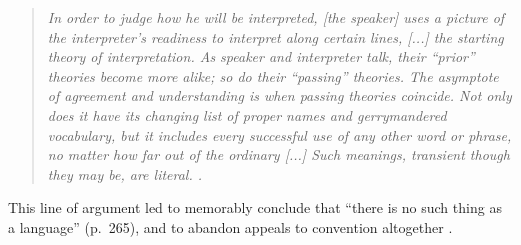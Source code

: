 \begin{quote}
\footnotesize\emph{In order to judge how he will be interpreted, [the speaker] uses a picture of the interpreter’s readiness to interpret along certain lines, [...] the starting theory of interpretation. %
As speaker and interpreter talk, their ``prior'' theories become more alike; so do their ``passing'' theories. 
The asymptote of agreement and understanding is when passing theories coincide. 
Not only does it have its changing list of proper names and gerrymandered vocabulary, but it includes every successful use of any other word or phrase, no matter how far out of the ordinary [...] 
Such meanings, transient though they may be, are literal. \cite[p.~261]{davidson_nice_1986}.}
\end{quote}

This line of argument led  to memorably conclude that ``there is no such thing as a language'' (p.~265), and to abandon appeals to convention altogether \cite<see also>[for discussion]{heck_idiolect,lepore2007reality,hacking1986nice,dummett1994}.%

